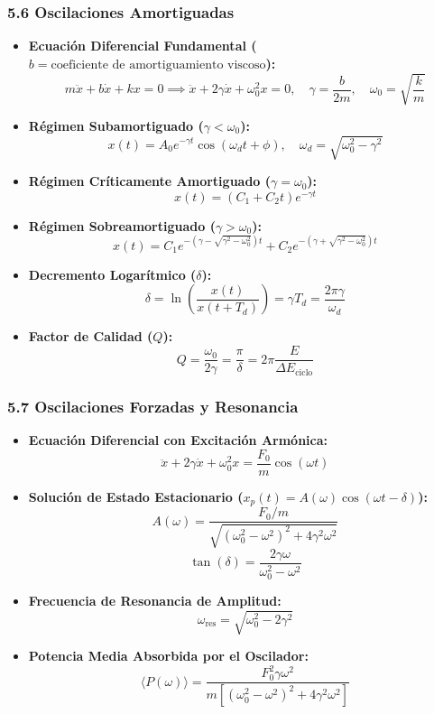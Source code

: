 \documentclass[11pt,a4paper]{article}
\begin{document}
\subsubsection*{5.6 Oscilaciones Amortiguadas}

\begin{itemize}
  \item \textbf{Ecuación Diferencial Fundamental ($b = \text{coeficiente de amortiguamiento viscoso}$):}
  \[
    m \ddot{x} + b \dot{x} + k x = 0 \implies \ddot{x} + 2\gamma \dot{x} + \omega_0^2 x = 0, \quad \gamma = \frac{b}{2m}, \quad \omega_0 = \sqrt{\frac{k}{m}}
  \]
  \item \textbf{Régimen Subamortiguado ($\gamma < \omega_0$):}
  \[
    x(t) = A_0 e^{-\gamma t} \cos(\omega_d t + \phi), \quad \omega_d = \sqrt{\omega_0^2 - \gamma^2}
  \]
  \item \textbf{Régimen Críticamente Amortiguado ($\gamma = \omega_0$):}
  \[
    x(t) = (C_1 + C_2 t) e^{-\gamma t}
  \]
  \item \textbf{Régimen Sobreamortiguado ($\gamma > \omega_0$):}
  \[
    x(t) = C_1 e^{-(\gamma - \sqrt{\gamma^2 - \omega_0^2})t} + C_2 e^{-(\gamma + \sqrt{\gamma^2 - \omega_0^2})t}
  \]
  \item \textbf{Decremento Logarítmico ($\delta$):}
  \[
    \delta = \ln\left( \frac{x(t)}{x(t + T_d)} \right) = \gamma T_d = \frac{2\pi \gamma}{\omega_d}
  \]
  \item \textbf{Factor de Calidad ($Q$):}
  \[
    Q = \frac{\omega_0}{2\gamma} = \frac{\pi}{\delta} = 2\pi \frac{E}{\Delta E_{\text{ciclo}}}
  \]
\end{itemize}

\subsubsection*{5.7 Oscilaciones Forzadas y Resonancia}

\begin{itemize}
  \item \textbf{Ecuación Diferencial con Excitación Armónica:}
  \[
    \ddot{x} + 2\gamma \dot{x} + \omega_0^2 x = \frac{F_0}{m} \cos(\omega t)
  \]
  \item \textbf{Solución de Estado Estacionario ($x_p(t) = A(\omega) \cos(\omega t - \delta)$):}
  \[
    A(\omega) = \frac{F_0 / m}{\sqrt{(\omega_0^2 - \omega^2)^2 + 4\gamma^2 \omega^2}}
  \]
  \[
    \tan(\delta) = \frac{2\gamma \omega}{\omega_0^2 - \omega^2}
  \]
  \item \textbf{Frecuencia de Resonancia de Amplitud:}
  \[
    \omega_{\text{res}} = \sqrt{\omega_0^2 - 2\gamma^2}
  \]
  \item \textbf{Potencia Media Absorbida por el Oscilador:}
  \[
    \langle P(\omega) \rangle = \frac{F_0^2 \gamma \omega^2}{m [(\omega_0^2 - \omega^2)^2 + 4\gamma^2 \omega^2]}
  \]
\end{itemize}
\end{document}
